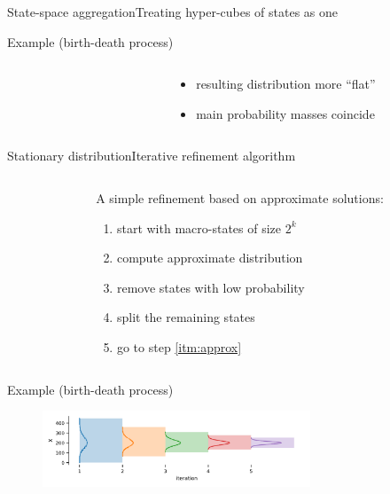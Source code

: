 \documentclass[9pt]{beamer}
\newcommand{\bottomcite}[1]{\vspace*{\fill} {\scriptsize \parencite{#1}}}
\begin{document}
\begin{frame}{State-space aggregation}{Treating hyper-cubes of states as one}
\begin{exampleblock}{Example (birth-death process)}
\begin{columns}
\begin{column}{.4\textwidth}
\begin{figure}
                \end{figure}
            \end{column}
            \begin{column}{.5\textwidth}
                \begin{itemize}
                    \item resulting distribution more ``flat''
                    \item  main probability masses coincide
                \end{itemize}
            \end{column}
        \end{columns}
    \end{exampleblock}
    \bottomcite{backenkohler2021abstraction}
\end{frame}

\begin{frame}{Stationary distribution}{Iterative refinement algorithm}
    \begin{columns}
        \begin{column}{.1\paperwidth}
        \end{column}
        \begin{column}{.85\paperwidth}
    A simple refinement based on approximate solutions:
    \begin{enumerate}
        \item start with macro-states of size $2^k$
        \item\label{itm:approx} compute approximate distribution
        \item remove states with low probability
        \item split the remaining states
        \item go to step \ref{itm:approx}
    \end{enumerate}
        \end{column}
    \end{columns}
    \vspace{3mm}
    \begin{exampleblock}{Example (birth-death process)}
    \begin{figure}
        \includegraphics[width=8cm]{../gfx/bd_truncs.pdf}
    \end{figure}
    \end{exampleblock}
    \bottomcite{backenkohler2020analysis,backenkohler2021abstraction}
\end{frame}
\end{document}
